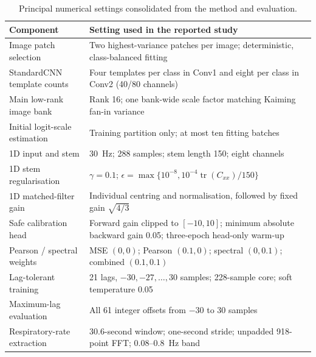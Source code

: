 \begin{table}[H]
\centering
\small
\begin{tabularx}{\textwidth}{@{}p{}X@{}}
\toprule
Component & Setting used in the reported study \\
\midrule
Image patch selection & Two highest-variance patches per image; deterministic, class-balanced fitting \\
StandardCNN template counts & Four templates per class in Conv1 and eight per class in Conv2 (40/80 channels) \\
Main low-rank image bank & Rank 16; one bank-wide scale factor matching Kaiming fan-in variance \\
Initial logit-scale estimation & Training partition only; at most ten fitting batches \\
1D input and stem & 30~Hz; 288 samples; stem length 150; eight channels \\
1D stem regularisation & $\gamma=0.1$; $\epsilon=\max\{10^{-8},10^{-4}\operatorname{tr}(C_{xx})/150\}$ \\
1D matched-filter gain & Individual centring and normalisation, followed by fixed gain $\sqrt{4/3}$ \\
Safe calibration head & Forward gain clipped to $[-10,10]$; minimum absolute backward gain 0.05; three-epoch head-only warm-up \\
Pearson / spectral weights & MSE $(0,0)$; Pearson $(0.1,0)$; spectral $(0,0.1)$; combined $(0.1,0.1)$ \\
Lag-tolerant training & 21 lags, $-30,-27,\ldots,30$ samples; 228-sample core; soft temperature 0.05 \\
Maximum-lag evaluation & All 61 integer offsets from $-30$ to $30$ samples \\
Respiratory-rate extraction & 30.6-second window; one-second stride; unpadded 918-point FFT; 0.08--0.8~Hz band \\
\bottomrule
\end{tabularx}
\caption{Principal numerical settings consolidated from the method and evaluation.}
\label{tab:implementation-settings}
\end{table}
